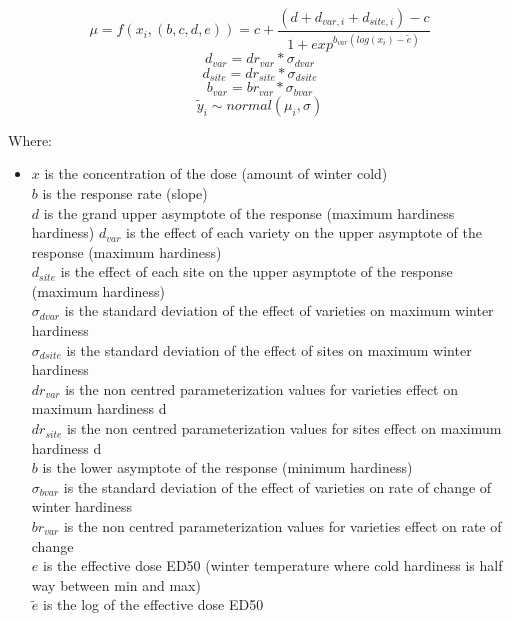 \documentclass[11pt,letter]{article}
\begin{document}
\begin{equation}
\label{modelWithPriors}
\mu=f(x_{i},(b,c,d,e))=c+\frac{(d+d_{var,i} + d_{site,i}) -c}{1+exp^{b_{var}(log(x_{i})-\tilde{e})}}
\end{equation}
\begin{equation}
{d}_{var} = dr_{var} * \sigma_{dvar}
\end{equation}
\begin{equation}
{d}_{site} = dr_{site} * \sigma_{dsite}
\end{equation}
\begin{equation}
{b}_{var} = br_{var} * \sigma_{bvar}
\end{equation}
\begin{equation}
\tilde{y}_{i}\sim normal(\mu_{i},\sigma)
\end{equation}

Where:
\begin{itemize}
\item[]$x$ is the concentration of the dose (amount of winter cold) \\
$b$ is the response rate (slope)\\
$d$ is the grand upper asymptote of the response (maximum hardiness hardiness) 
$d_{var}$ is the effect of each variety on the upper asymptote of the response (maximum hardiness)\\
$d_{site}$ is the effect of each site on the upper asymptote of the response (maximum hardiness)\\
$\sigma_{dvar}$ is the standard deviation of the effect of varieties on maximum winter hardiness\\
$\sigma_{dsite}$ is the standard deviation of the effect of sites on maximum winter hardiness\\
$dr_{var}$ is the non centred parameterization values for varieties effect on maximum hardiness d\\
$dr_{site}$ is the non centred parameterization values for sites effect on maximum hardiness d\\
$b$ is the lower asymptote of the response (minimum hardiness)\\
$\sigma_{bvar}$ is the standard deviation of the effect of varieties on rate of change of winter hardiness\\
$br_{var}$ is the non centred parameterization values for varieties effect on rate of change\\
$e$ is the effective dose ED50 (winter temperature where cold hardiness is half way between min and max)  \\
$\tilde{e}$ is the log of the effective dose ED50\\
\end{itemize}
\end{document}
